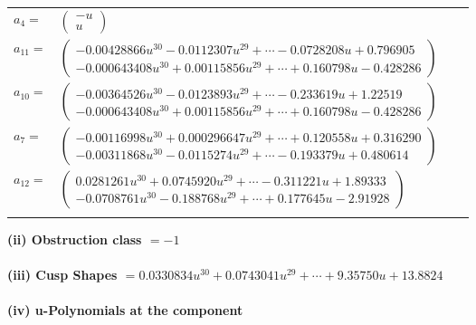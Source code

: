 \documentclass[1p]{elsarticle_modified}
\theoremstyle{definition}
\begin{document}
\begin{tabular}{m{7pt} m{180pt} m{7pt} m{180pt} }
\flushright $a_{4}=$&$\begin{pmatrix}- u\\u\end{pmatrix}$ \\
\flushright $a_{11}=$&$\begin{pmatrix}-0.00428866 u^{30}-0.0112307 u^{29}+\cdots-0.0728208 u+0.796905\\-0.000643408 u^{30}+0.00115856 u^{29}+\cdots+0.160798 u-0.428286\end{pmatrix}$ \\
\flushright $a_{10}=$&$\begin{pmatrix}-0.00364526 u^{30}-0.0123893 u^{29}+\cdots-0.233619 u+1.22519\\-0.000643408 u^{30}+0.00115856 u^{29}+\cdots+0.160798 u-0.428286\end{pmatrix}$ \\
\flushright $a_{7}=$&$\begin{pmatrix}-0.00116998 u^{30}+0.000296647 u^{29}+\cdots+0.120558 u+0.316290\\-0.00311868 u^{30}-0.0115274 u^{29}+\cdots-0.193379 u+0.480614\end{pmatrix}$ \\
\flushright $a_{12}=$&$\begin{pmatrix}0.0281261 u^{30}+0.0745920 u^{29}+\cdots-0.311221 u+1.89333\\-0.0708761 u^{30}-0.188768 u^{29}+\cdots+0.177645 u-2.91928\end{pmatrix}$\\&\end{tabular}
\flushleft \textbf{(ii) Obstruction class $= -1$}\\~\\
\flushleft \textbf{(iii) Cusp Shapes $= 0.0330834 u^{30}+0.0743041 u^{29}+\cdots+9.35750 u+13.8824$}\\~\\
\newpage\renewcommand{\arraystretch}{1}
\flushleft \textbf{(iv) u-Polynomials at the component}\newline \\
\end{document}
